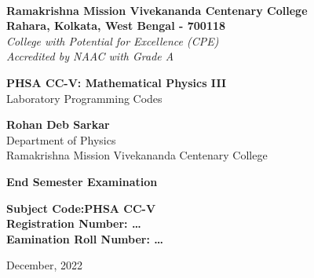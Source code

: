 \begin{titlepage}
    \begin{center}
        \\
        \large\textbf{Ramakrishna Mission Vivekananda Centenary College}\\
        \normalsize\textbf{Rahara, Kolkata, West Bengal - 700118}\\
        \small\slshape College with Potential for Excellence (CPE)\\
        \small\normalfont Accredited by NAAC with Grade A

        \vfill

        \large\textbf{PHSA CC-V: Mathematical Physics III}\\
        \normalsize Laboratory Programming Codes

        \vfill

        \large\textbf{Rohan Deb Sarkar}\\
        \normalsize Department of Physics\\
        \normalsize Ramakrishna Mission Vivekananda Centenary College

        \vfill

        \Large \textbf{End Semester Examination}\\

        \vspace{2em}

        \large
        \textbf{Subject Code:\hfill PHSA CC-V\\
                Registration Number: \hfill \dots\\
                Eamination Roll Number: \hfill \dots\\
        }
        
        \vfill

        \normalsize December, 2022
    \end{center}
\end{titlepage}